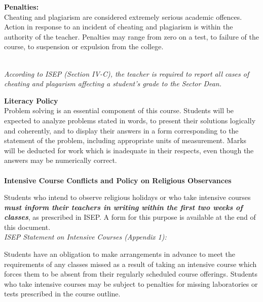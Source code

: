 \documentclass[10pt]{article}
\begin{document}
\begin{multicols}{2}
\textbf{Penalties:}\\
Cheating and plagiarism are considered extremely serious academic
offences. Action in response to an incident of cheating and
plagiarism is within the authority of the teacher.
Penalties may range from zero on a test, to failure of the
course, to suspension or expulsion from the college.\\ \\ \vspace{-0.1in}

\textit{According to ISEP (Section IV-C), the teacher is required to report all cases of cheating and plagarism affecting a student's grade to the Sector Dean.}
\vfill
\columnbreak

\large{\textbf{Literacy Policy}}\\
\vspace{-0.15in}\hline \bigskip \normalsize
Problem solving is an essential component of this course.  Students will be expected to analyze problems stated in words, to present their solutions logically and coherently, and to display their answers in a form corresponding to the statement of the problem, including appropriate units of measurement.  Marks will be deducted for work which is inadequate in their respects, even though the answers may be numerically correct. \\ \\


\large\textbf{Intensive Course Conflicts and Policy on Religious Observances}\\
\vspace{-0.15in}\hline \bigskip \normalsize

Students who intend to observe religious holidays or who take intensive courses \textit{\textbf{must inform their
teachers in writing within the first two weeks of classes}}, as prescribed in ISEP.
A form for this purpose is available at the end of this document. \\

\textit{ISEP Statement on Intensive Courses (Appendix 1):}\\\vspace{-0.1in}

Students have an obligation to make arrangements in advance to meet the requirements of any classes missed as a result of taking an intensive course which forces them to be absent from their regularly scheduled course offerings.  Students who take intensive courses may be subject to penalties for missing laboratories or tests prescribed in the course outline. \\


\end{multicols}
\end{document}
